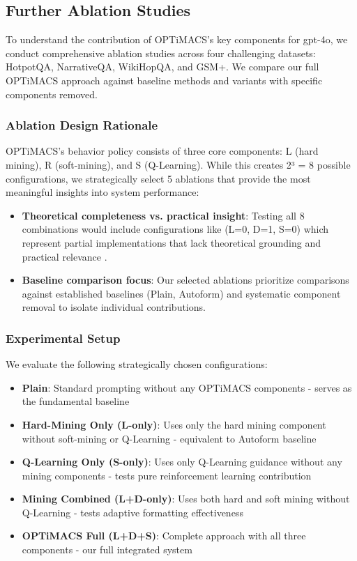 \subsection{Further Ablation Studies}\label{ablation}
\label{sec:ablations}
To understand the contribution of OPTiMACS's key components for gpt-4o, we conduct comprehensive ablation studies across four challenging datasets: HotpotQA, NarrativeQA, WikiHopQA, and GSM+. We compare our full OPTiMACS approach against baseline methods and variants with specific components removed.

\subsubsection{Ablation Design Rationale}
OPTiMACS's behavior policy consists of three core components: L (hard mining), R (soft-mining), and S (Q-Learning). While this creates 2³ = 8 possible configurations, we strategically select 5 ablations that provide the most meaningful insights into system performance:

\begin{itemize}
    \item \textbf{Theoretical completeness vs. practical insight}: Testing all 8 combinations would include configurations like (L=0, D=1, S=0) which represent partial implementations that lack theoretical grounding and practical relevance \cite{sutton2018reinforcement}.
    \item \textbf{Baseline comparison focus}: Our selected ablations prioritize comparisons against established baselines (Plain, Autoform) and systematic component removal to isolate individual contributions.
\end{itemize}

\subsubsection{Experimental Setup}
We evaluate the following strategically chosen configurations:
\begin{itemize}
    \item \textbf{Plain}: Standard prompting without any OPTiMACS components - serves as the fundamental baseline
    \item \textbf{Hard-Mining Only (L-only)}: Uses only the hard mining component without soft-mining or Q-Learning - equivalent to Autoform baseline \cite{chen-etal-2024-beyond-natural}
    \item \textbf{Q-Learning Only (S-only)}: Uses only Q-Learning guidance without any mining components - tests pure reinforcement learning contribution
    \item \textbf{Mining Combined (L+D-only)}: Uses both hard and soft mining without Q-Learning - tests adaptive formatting effectiveness
    \item \textbf{OPTiMACS Full (L+D+S)}: Complete approach with all three components - our full integrated system
\end{itemize}

